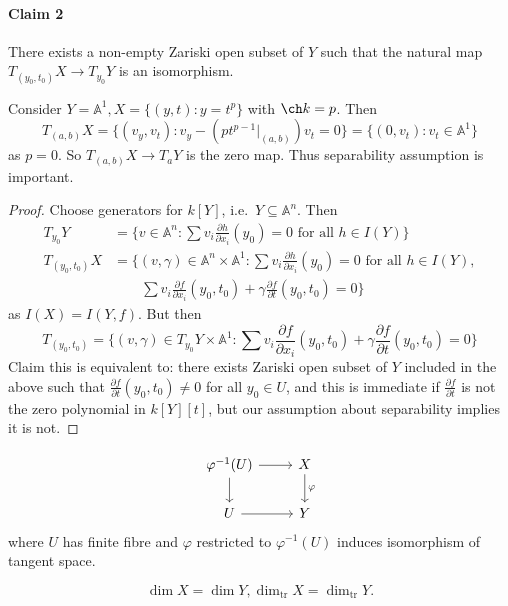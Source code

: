 \documentclass[a4paper]{article}
\renewcommand{\A}{\mathbb{A}}
\begin{document}
\paragraph{Claim 2}

There exists a non-empty Zariski open subset of \(Y\) such that the natural map \(T_{(y_0, t_0)}X \to T_{y_0}Y\) is an isomorphism.

\begin{remark}
  Consider \(Y = \A^1, X = \{(y, t): y= t^p\}\) with \(\ch k = p\). Then
  \[
    T_{(a, b)}X = \{(v_y, v_t): v_y - (pt^{p - 1}|_{(a, b)}) v_t = 0\}
    = \{(0, v_t): v_t \in \A^1\}
  \]
  as \(p = 0\). So \(T_{(a, b)}X \to T_a Y\) is the zero map. Thus separability assumption is important.
\end{remark}

\begin{proof}
  Choose generators for \(k[Y]\), i.e.\ \(Y \subseteq \A^n\). Then
  \begin{align*}
    T_{y_0}Y &= \{v \in \A^n: \sum v_i \frac{\partial h}{\partial x_i} (y_0) = 0 \text{ for all } h \in I(Y)\} \\
    T_{(y_0, t_0)} X &= \{(v, \gamma) \in \A^n \times \A^1: \sum v_i \frac{\partial h}{\partial x_i}(y_0) = 0 \text{ for all } h \in I(Y), \\
    &\qquad \sum v_i \frac{\partial f}{\partial x_i}(y_0, t_0) + \gamma \frac{\partial f}{\partial t}(y_0, t_0) = 0\}
  \end{align*}
  as \(I(X) = I(Y, f)\). But then
  \[
    T_{(y_0, t_0)} = \{(v, \gamma) \in T_{y_0} Y \times \A^1: \sum v_i \frac{\partial f}{\partial x_i}(y_0, t_0) + \gamma \frac{\partial f}{\partial t}(y_0, t_0) = 0\}
  \]
  Claim this is equivalent to: there exists Zariski open subset of \(Y\) included in the above such that \(\frac{\partial f}{\partial t}(y_0, t_0) \neq 0\) for all \(y_0 \in U\), and this is immediate if \(\frac{\partial f}{\partial t}\) is not the zero polynomial in \(k[Y][t]\), but our assumption about separability implies it is not.
\end{proof}

\[
  \begin{tikzcd}
    \varphi^{-1}(U) \ar[r] \ar[d] & X \ar[d, "\varphi"] \\
    U \ar[r] & Y
  \end{tikzcd}
\]
where \(U\) has finite fibre and \(\varphi\) restricted to \(\varphi^{-1}(U)\) induces isomorphism of tangent space.

\begin{corollary}
  \[
    \dim X = \dim Y, \dim_{\text{tr}} X = \dim_{\text{tr}} Y.
  \]
\end{corollary}
\end{document}
